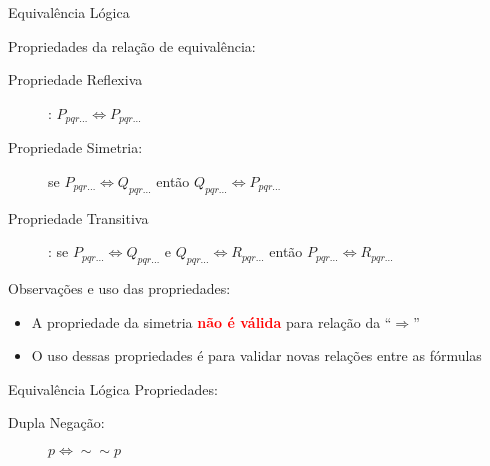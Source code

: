 \begin{frame}[t]{Equivalência Lógica} %
	
	\begin{block} {Propriedades da relação de equivalência:}
		
	\begin{description}
	\item [Propriedade Reflexiva]: $P_{pqr\ldots} \Leftrightarrow P_{pqr\ldots}$


	\item [Propriedade Simetria:] se $P_{pqr\ldots} \Leftrightarrow Q_{pqr\ldots}$ então
	$Q_{pqr\ldots} \Leftrightarrow P_{pqr\ldots}$
	

	\item [Propriedade Transitiva]: se $P_{pqr\ldots} \Leftrightarrow Q_{pqr\ldots}$ e $Q_{pqr\ldots} \Leftrightarrow R_{pqr\ldots}$ então $P_{pqr\ldots} \Leftrightarrow R_{pqr\ldots}$

	\end{description}
\end{block}	

\pause

\begin{block} {Observações e uso das propriedades:}

  \begin{itemize}
  
    \item A propriedade da simetria \textbf{\textcolor{red}{não é válida}} para relação da ``$\Rightarrow$''

    \item O uso dessas propriedades é para validar novas relações entre as fórmulas
    

  \end{itemize}
  
\end{block}	
	
\end{frame}



\begin{frame}[t]{Equivalência Lógica} %
	Propriedades:
	\begin{description}
	\item [Dupla Negação:] $p \Leftrightarrow \sim\sim p$
	\end{description}
\end{frame}

